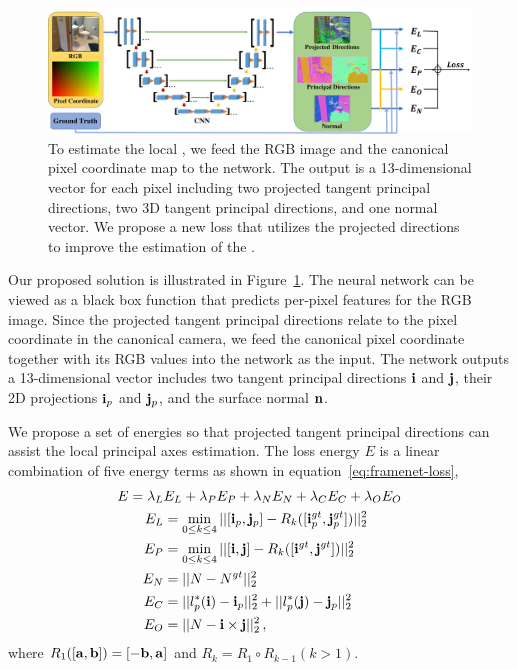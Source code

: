 \begin{figure}
    \centering
    \includegraphics[width=\linewidth]{FrameNet/graph/architecture.pdf}
    \caption{To estimate the local \cframe{}, we feed the RGB image and the canonical pixel coordinate map to the network. The output is a 13-dimensional vector for each pixel including two projected tangent principal directions, two 3D tangent principal directions, and one normal vector. We propose a new loss that utilizes the projected directions to improve the estimation of the \cframe{}.}
    \label{fig:framenet-architecture}
\end{figure}
Our proposed solution is illustrated in Figure~\ref{fig:framenet-architecture}. The neural network can be viewed as a black box function that predicts per-pixel features for the RGB image. Since the projected tangent principal directions relate to the pixel coordinate in the canonical camera, we feed the canonical pixel coordinate together with its RGB values into the network as the input. The network outputs a 13-dimensional vector includes two tangent principal directions $\mathbf{i}$ and $\mathbf{j}$, their 2D projections $\mathbf{i}_p$ and $\mathbf{j}_p$, and the surface normal $\mathbf{n}$.

We propose a set of energies so that projected tangent principal directions can assist the local principal axes estimation. The loss energy $E$ is a linear combination of five energy terms as shown in equation~\ref{eq:framenet-loss},
\begin{align}
\begin{split}
  E = \lambda_L &E_L + \lambda_P E_P + \lambda_N E_N + \lambda_C E_C + \lambda_O E_O\\
  E_L &= \min_{0\leq k \le 4} ||[\mathbf{i}_p,\mathbf{j}_p] - R_k([\mathbf{i}_p^{gt},\mathbf{j}_p^{gt}])||_2^2\\
  E_P &= \min_{0\leq k \le 4} ||[\mathbf{i},\mathbf{j}] - R_k([\mathbf{i}^{gt},\mathbf{j}^{gt}])||_2^2\\
  E_N &= ||N - N^{gt}||_2^2\\
  E_C &= ||l^*_p(\mathbf{i}) - \mathbf{i}_p||_2^2+||l^*_p(\mathbf{j}) - \mathbf{j}_p||_2^2\\
  E_O &= ||N - \mathbf{i}\times\mathbf{j}||_2^2\,, \\
\end{split}
\label{eq:framenet-loss}
\end{align}
where $R_1([\mathbf{a},\mathbf{b}])=[-\mathbf{b},\mathbf{a}]$ and $R_k = R_1\circ R_{k-1} (k>1)$.

